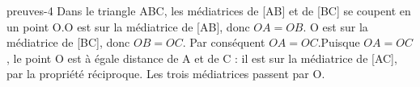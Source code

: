 \begin{blocEdition}{preuves-4}
Dans le triangle ABC, les médiatrices de [AB] et de [BC] se coupent en un point O.O est sur la médiatrice de [AB], donc $OA=OB$. O est sur la médiatrice de [BC], donc $OB=OC$. Par conséquent $OA=OC$.Puisque $OA=OC$, le point O est à égale distance de A et de C : il est sur la médiatrice de [AC], par la propriété réciproque. Les trois médiatrices passent par O.
\end{blocEdition}

